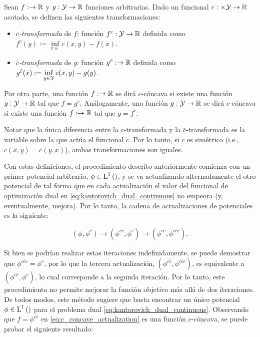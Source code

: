 \begin{defn}
	\label{defn:c_transform}
	Sean $f:\to\mathbb{R}$ y $g:\mathcal{Y}\to \mathbb{R}$ funciones arbitrarias. Dado un funcional $c:\times\mathcal{Y}\to\mathbb{R}$ acotado, se definen las siguientes transformaciones:

	\begin{itemize}
		\item \textit{$c$-transformada}  de $f$: función $f^c:\mathcal{Y}\to\mathbb{R}$ definida como $f^c(y) := \inf\limits_{x\in\xspace} c(x,y) - f(x)$.

		\item \textit{$\bar c$-transformada}  de $g$: función $g^{\bar c}:\to\mathbb{R}$ definida como $g^{\bar c}(x) := \inf\limits_{y\in\mathcal{Y}} c(x,y) - g(y)$.
	\end{itemize}

	Por otra parte, una función $f:\to\mathbb{R}$ se dirá $c$-cóncava si existe una función $g:\mathcal{Y}\to\mathbb{R}$ tal que $f=g^{\bar c}$. Análogamente, una función $g:\mathcal{Y}\to\mathbb{R}$ se dirá $\bar c$-cóncava si existe una función $f:\to\mathbb{R}$ tal que $g=f^c$.
\end{defn}

Notar que la única diferencia entre la $c$-transformada y la $\bar c$-transformada es la variable sobre la que actúa el funcional $c$. Por lo tanto, si $c$ es simétrico (i.e., $c(x,y)=c(y,x)$), ambas transformaciones son iguales.

Con estas definiciones, el procedimiento descrito anteriormente comienza con un primer potencial arbitrario, $\phi\in \operatorname{L}^{1}\left(\right)$, y se va actualizando alternadamente el otro potencial de tal forma que en cada actualización el valor del funcional de optimización dual en \eqref{eq:kantorovich_dual_continuous} no empeora (y, eventualmente, mejora). Por lo tanto, la cadena de actualizaciones de potenciales es la siguiente:

\begin{equation}
	\label{eq:c_concave_actualization}
	(\phi,\phi^c) \to (\phi^{c\bar c}, \phi^c) \to (\phi^{c\bar c}, \phi^{c\bar c c}) .
\end{equation}

Si bien se podrían realizar estas iteraciones indefinidamente, se puede demostrar que $\phi^{c\bar c c} = \phi^c$, por lo que la tercera actualización, $(\phi^{c\bar c}, \phi^{c\bar c c})$, es equivalente a $(\phi^{c\bar c}, \phi^c)$, lo cual corresponde a la segunda iteración. Por lo tanto, este procedimiento no permite mejorar la función objetivo más allá de dos iteraciones. De todos modos, este método sugiere que basta encontrar un único potencial $\phi\in \operatorname{L}^{1}\left(\right)$ para el problema dual \eqref{eq:kantorovich_dual_continuous}. Observando que $f=\phi^{c\bar c}$ en \eqref{eq:c_concave_actualization} es una función $c$-cóncava, se puede probar el siguiente resultado:

